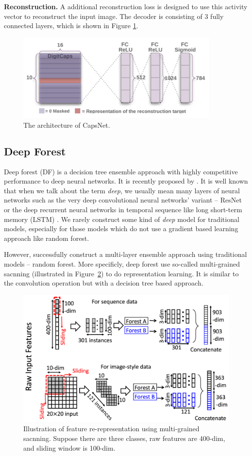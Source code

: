 \documentclass{article} %
\begin{document}
\textbf{Reconstruction.} A additional reconstruction loss is designed to  use this activity vector to reconstruct the input image. The decoder is consisting of 3 fully connected layers, which is shown in Figure \ref{fig:reconstruction}.
\begin{figure}[htbp]
	\centering
	\includegraphics[width=0.9\textwidth]{figs/construction.png}
	\caption{The architecture of CapsNet.}
	\label{fig:reconstruction}
\end{figure}

\subsection{Deep Forest}
Deep forest (DF) is a decision tree ensemble approach with highly competitive performance to deep neural networks. It is recently proposed by \cite{zhou2017deep}. It is well known that when we talk about the term \textit{deep}, we usually mean many layers of neural networks such as the very deep convolutional neural networks' variant -- ResNet \cite{he2016deep} or the deep recurrent neural networks in temporal sequence like long short-term memory (LSTM) \cite{hochreiter1997long}. We rarely construct some kind of \textit{deep} model for traditional models, especially for those models which do not use a gradient based learning approach like random forest.

However, \cite{zhou2017deep} successfully construct a multi-layer ensemble approach using traditional models -- random forest. More specificly, deep forest use so-called multi-grained sacnning (illustrated in Figure~\ref{fig:multi-grained-scanning}) to do representation learning. It is similar to the convolution operation but with a decision tree based approach. 
\begin{figure}[h]
	\centering
	\includegraphics[width=0.7\linewidth]{./figs/multi-grained-scanning}
	\caption{ Illustration of feature re-representation using multi-grained sacnning. Suppose there are three classes, raw features are 400-dim, and sliding window is 100-dim.}
	\label{fig:multi-grained-scanning}
\end{figure}
\end{document}
